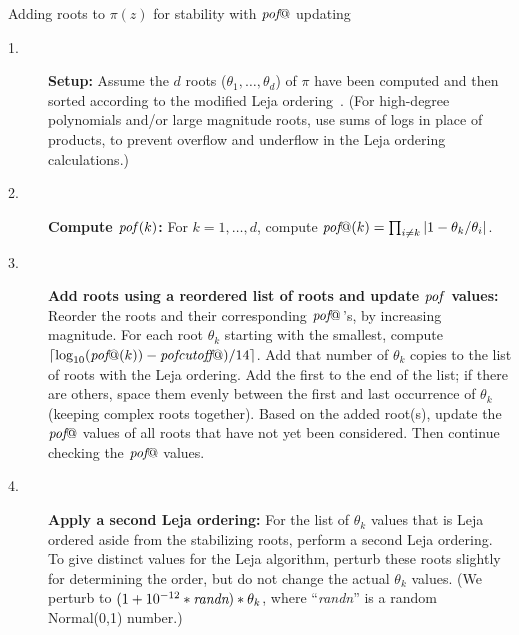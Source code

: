 \documentclass{siamart}
\makeatletter
\def\mrpoly{\pi}    %
\def\pof{\mbox{{\it pof}}@}
\def\pofcutoff{\mbox{{\it pofcutoff}}@}
\makeatother
\begin{document}
\begin{algorithm}
    \caption{Adding roots to $\pi(z)$ for stability with $\pof$ updating}
    \begin{description}
 \item[1.] {\bf Setup:} Assume the $d$ roots ($\theta_1, \ldots, \theta_d$) of $\mrpoly$ have been computed and then sorted according to the modified Leja ordering~\cite[alg.~3.1]{BaHuRe}.  (For high-degree polynomials and/or large magnitude roots, use sums of logs in place of products, to prevent overflow and underflow in the Leja ordering calculations.)
 \item[2.] {\bf Compute \boldmath ${\it pof}(k)$:} For $k=1,\ldots,d$, compute $\pof(k) = \prod_{i \neq k} |1-\theta_k/\theta_i|$.  
 \item[3.] \textbf{Add roots using a reordered list of roots and update \boldmath${\it pof}$ values:} Reorder the roots and their corresponding $\pof\kern1pt$'s, 
by increasing magnitude.  For each root $\theta_k$ starting with the smallest, compute $\lceil \log_{10}(\pof(k)) - \pofcutoff)/14\rceil$.  Add that number of $\theta_k$ copies to the list of roots with the Leja ordering.  Add the first to the end of the list; if there are others, space them evenly between the first and last occurrence of $\theta_k$ (keeping complex roots together).
 Based on the added root(s), update the $\pof$ values of all roots that have not yet been considered.  Then continue checking the $\pof$ values.
 \item[4.] {\bf Apply a second Leja ordering:} For the list of $\theta_k$ values that is Leja ordered aside from the stabilizing roots, perform a second Leja ordering.  To give distinct values for the Leja algorithm, perturb these roots slightly for determining the order, but do not change the actual $\theta_k$ values.  (We  perturb to $(1 + 10^{-12}*\mbox{\em randn})*\theta_k$, where ``{\em randn}'' is a random Normal(0,1) number.)
\end{description}
\label{Alg:RootAdding2}
\end{algorithm}
\end{document}
